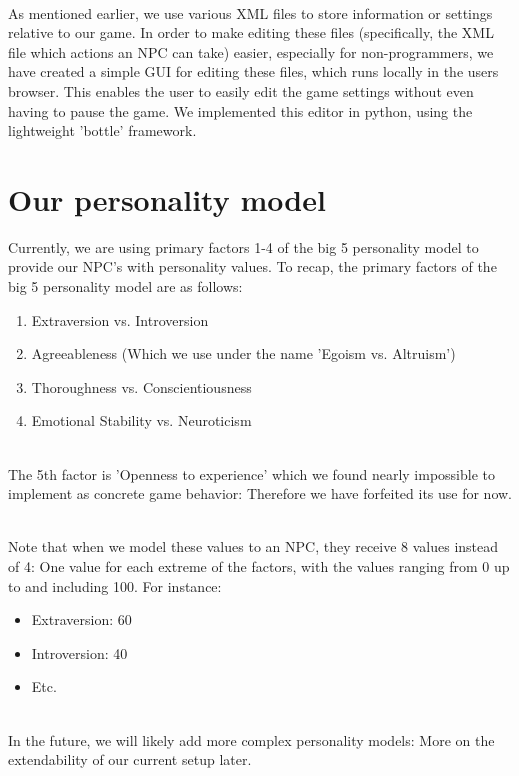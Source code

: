 \documentclass[11pt]{article} %
\begin{document}
~\\
As mentioned earlier, we use various XML files to store information or settings relative to our game. In order to make editing these files (specifically, the XML file which actions an NPC can take) easier, especially for non-programmers, we have created a simple GUI for editing these files, which runs locally in the users browser. This enables the user to easily edit the game settings without even having to pause the game. We implemented this editor in python, using the lightweight 'bottle' framework.

\newpage
\section{Our personality model}
Currently, we are using primary factors 1-4 of the big 5 personality model to provide our NPC's with personality values. To recap, the primary factors of the big 5 personality model are as follows:

\begin{enumerate}
\item Extraversion vs. Introversion
\item Agreeableness (Which we use under the name 'Egoism vs. Altruism')
\item Thoroughness vs. Conscientiousness
\item Emotional Stability vs. Neuroticism
\end{enumerate}

~\\
The 5th factor is 'Openness to experience' which we found nearly impossible to implement as concrete game behavior: Therefore we have forfeited its use for now.

~\\
Note that when we model these values to an NPC, they receive 8 values instead of 4: One value for each extreme of the factors, with the values ranging from 0 up to and including 100.
For instance:

\begin{itemize}
\item Extraversion: 60
\item Introversion: 40
\item Etc.
\end{itemize}

~\\
In the future, we will likely add more complex personality models: More on the extendability of our current setup later.
\end{document}
